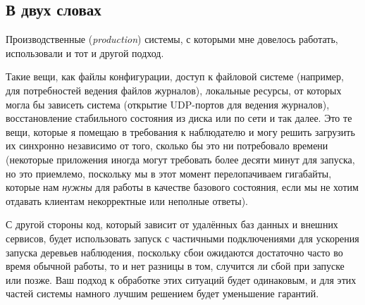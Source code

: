 \subsection{В двух словах}
\label{subsec:start-link-in-a-nutshell}

Производственные (\emph{production}) системы, с которыми мне довелось работать, использовали и тот и другой подход.

Такие вещи, как файлы конфигурации, доступ к файловой системе (например, для потребностей ведения файлов журналов), локальные ресурсы, от которых могла бы зависеть система (открытие UDP-портов для ведения журналов), восстановление стабильного состояния из диска или по сети и так далее. Это те вещи, которые я помещаю в требования к наблюдателю и могу решить загрузить их синхронно независимо от того, сколько бы это ни потребовало времени (некоторые приложения иногда могут требовать более десяти минут для запуска, но это приемлемо, поскольку мы в этот момент перелопачиваем гигабайты, которые нам \emph{нужны} для работы в качестве базового состояния, если мы не хотим отдавать клиентам некорректные или неполные ответы).

С другой стороны код, который зависит от удалённых баз данных и внешних сервисов, будет использовать запуск с частичными подключениями для ускорения запуска деревьев наблюдения, поскольку сбои ожидаются достаточно часто во время обычной работы, то и нет разницы в том, случится ли сбой при запуске или позже. Ваш подход к обработке этих ситуаций будет одинаковым, и для этих частей системы намного лучшим решением будет уменьшение гарантий.


